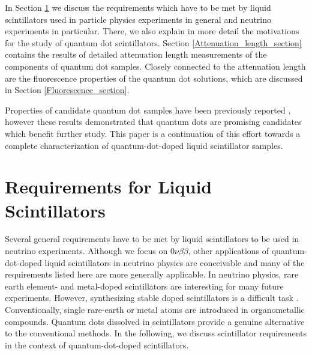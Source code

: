 \documentclass[cits]{JINST}
\begin{document}
In Section \ref{Requirements_section} we discuss the requirements which have to be met by liquid scintillators used in particle physics experiments in general and neutrino experiments in particular. There, we also explain in more detail the motivations for the study of quantum dot scintillators. Section \ref{Attenuation_length_section} contains the results of detailed attenuation length measurements of the components of quantum dot samples. Closely connected to the attenuation length are the fluorescence properties of the quantum dot solutions, which are discussed in Section \ref{Fluorescence_section}. 


Properties of candidate quantum dot samples have been previously reported \cite{mitpaper}, however these results demonstrated that quantum dots are promising candidates which benefit further study. This paper is a continuation of this effort towards a complete characterization of quantum-dot-doped liquid scintillator samples. 


\section{Requirements for Liquid Scintillators}\label{Requirements_section}
Several general requirements have to be met by liquid scintillators to be used in neutrino experiments. Although we focus on 0$\nu\beta\beta$, other applications of quantum-dot-doped liquid scintillators in neutrino physics are conceivable \cite{mitpaper} and many of the requirements listed here are more generally applicable. In neutrino physics, rare earth element- and metal-doped scintillators are interesting for many future experiments. However, synthesizing stable doped scintillators is a difficult task \cite{gd_mpik,chooz,piepke}. Conventionally, single rare-earth or metal atoms are introduced in organometallic compounds. Quantum dots dissolved in scintillators provide a genuine alternative to the conventional methods. In the following, we discuss scintillator requirements in the context of quantum-dot-doped scintillators.  
\end{document}
